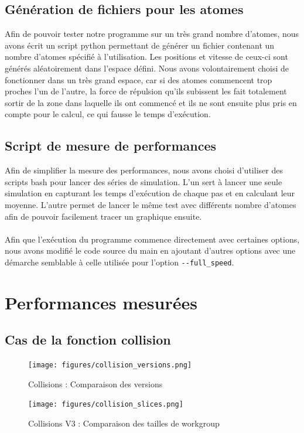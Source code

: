 \documentclass{article}
\begin{document}
\subsection{Génération de fichiers pour les atomes}
Afin de pouvoir tester notre programme sur un très grand nombre d'atomes, nous
avons écrit un script python permettant de générer un fichier contenant un
nombre d'atomes spécifié à l'utilisation. Les positions et vitesse de ceux-ci
sont générés aléatoirement dans l'espace défini. Nous avons volontairement
choisi de fonctionner dans un très grand espace, car si des atomes commencent
trop proches l'un de l'autre, la force de répulsion qu'ils subissent les fait
totalement sortir de la zone dans laquelle ils ont commencé et ils ne sont
ensuite plus pris en compte pour le calcul, ce qui fausse le temps d'exécution.

\subsection{Script de mesure de performances}
Afin de simplifier la mesure des performances, nous avons choisi d'utiliser des
scripts bash pour lancer des séries de simulation. L'un sert à lancer une seule
simulation en capturant les temps d'exécution de chaque pas et en calculant leur
moyenne. L'autre permet de lancer le même test avec différents nombre d'atomes
afin de pouvoir facilement tracer un graphique ensuite.
\paragraph{}
Afin que l'exécution du programme commence directement avec certaines options,
nous avons modifié le code source du main en ajoutant d'autres options avec une
démarche semblable à celle utilisée pour l'option \verb!--full_speed!.

\section{Performances mesurées}

\subsection{Cas de la fonction collision}
\begin{figure}[p]
	\caption{Collisions : Comparaison des versions}
	\label{collisions-versions}
	\texttt{[image: figures/collision\_versions.png]}
\end{figure}
\begin{figure}[p]
	\caption{Collisions V3 : Comparaison des tailles de workgroup}
	\label{collisions-slices}
	\texttt{[image: figures/collision\_slices.png]}
\end{figure}
\end{document}
